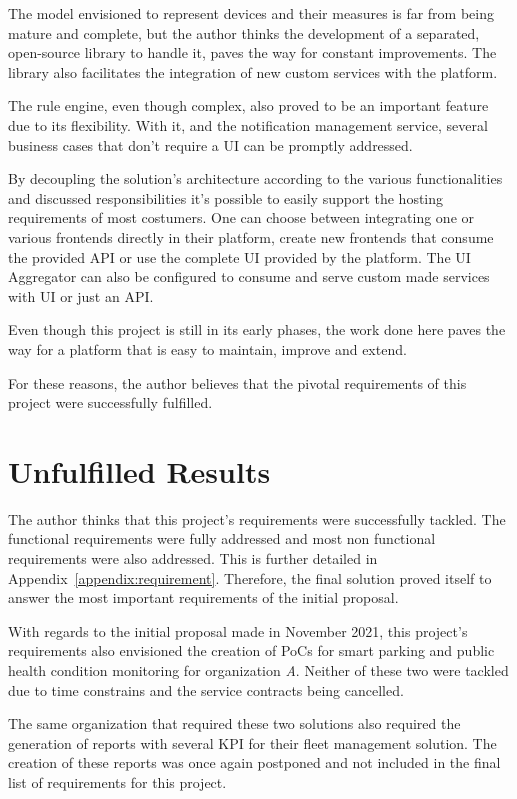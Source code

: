 The model envisioned to represent devices and their measures is far from being mature and complete, but the author thinks the development of a separated, open-source library to handle it, paves the way for constant improvements. The library also facilitates the integration of new custom services with the platform.

The rule engine, even though complex, also proved to be an important feature due to its flexibility. With it, and the notification management service, several business cases that don't require a \gls{UI} can be promptly addressed.

By decoupling the solution's architecture according to the various functionalities and discussed responsibilities it's possible to easily support the hosting requirements of most costumers. One can choose between integrating one or various frontends directly in their platform, create new frontends that consume the provided \gls{API} or use the complete \gls{UI} provided by the platform. The \gls{UI} Aggregator can also be configured to consume and serve custom made services with \gls{UI} or just an \gls{API}.

Even though this project is still in its early phases, the work done here paves the way for a platform that is easy to maintain, improve and extend.

For these reasons, the author believes that the pivotal requirements of this project were successfully fulfilled.

\section{Unfulfilled Results}
\label{sec:conclusion:unfulfilled}

The author thinks that this project's requirements were successfully tackled. The functional requirements were fully addressed and most non functional requirements were also addressed. This is further detailed in Appendix~\ref{appendix:requirement}. Therefore, the final solution proved itself to answer the most important requirements of the initial proposal.

With regards to the initial proposal made in November 2021, this project's requirements also envisioned the creation of \gls{PoC}s for smart parking and public health condition monitoring for organization \textit{A}. Neither of these two were tackled due to time constrains and the service contracts being cancelled. 

The same organization that required these two solutions also required the generation of reports with several \gls{KPI} for their fleet management solution. The creation of these reports was once again postponed and not included in the final list of requirements for this project.

